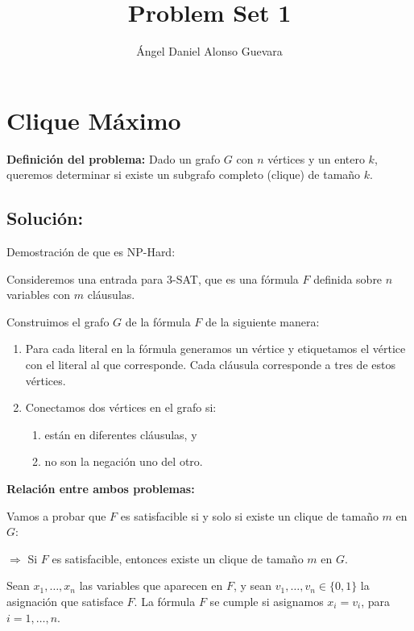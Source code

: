\documentclass[9pt]{article}
\title{Problem Set 1}
\author{Ángel Daniel Alonso Guevara}
\date{}
\begin{document}
    \maketitle
    \large
    
    \section*{Clique Máximo}
    
    \textbf{Definición del problema:}   
    Dado un grafo \( G \) con \( n \) vértices y un entero \( k \), queremos determinar si existe un subgrafo completo (clique) de tamaño \( k \).
    
    \subsection*{Solución:}
    
    Demostración de que es NP-Hard:
    
    Consideremos una entrada para 3-SAT, que es una fórmula \( F \) definida sobre \( n \) variables con \( m \) cláusulas.
    
    Construimos el grafo $G$ de la fórmula $F$ de la siguiente manera:
    
    \begin{enumerate}
        \item Para cada literal en la fórmula generamos un vértice y etiquetamos el vértice con el literal al que corresponde. Cada cláusula corresponde a tres de estos vértices.
        \item Conectamos dos vértices en el grafo si:
        \begin{enumerate}
            \item están en diferentes cláusulas, y
            \item no son la negación uno del otro.
        \end{enumerate}     
    \end{enumerate}
    
    \textbf{Relación entre ambos problemas:}
    
    Vamos a probar que $F$ es satisfacible si y solo si existe un clique de tamaño $m$ en $G$:
    
    \textbf{$\Rightarrow$} Si $F$ es satisfacible, entonces existe un clique de tamaño $m$ en $G$.
    
    Sean \( x_1, \ldots, x_n \) las variables que aparecen en \( F \), y sean \( v_1, \ldots, v_n \in \{0, 1\} \) la asignación que satisface \( F \). La fórmula \( F \) se cumple si asignamos \( x_i = v_i \), para \( i = 1, \ldots, n \).
    
\end{document}
